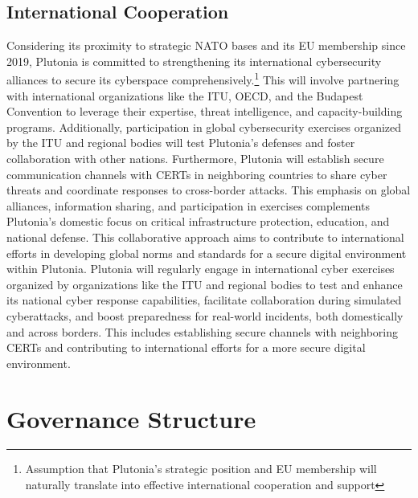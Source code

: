 \documentclass[
	a4paper, %
	10pt, %
]{CSSullivanBusinessReport}
\begin{document}
\begin{fullwidth}
\begin{justify}
\subsection{International Cooperation}
Considering its proximity to strategic NATO bases and its EU membership since 2019, Plutonia is committed to strengthening its international cybersecurity alliances to secure its cyberspace comprehensively.\footnote{Assumption that Plutonia’s strategic position and EU membership will naturally translate into effective international cooperation and support} This will involve partnering with international organizations like the ITU, OECD, and the Budapest Convention to leverage their expertise, threat intelligence, and capacity-building programs. Additionally, participation in global cybersecurity exercises organized by the ITU and regional bodies will test Plutonia's defenses and foster collaboration with other nations. Furthermore, Plutonia will establish secure communication channels with CERTs in neighboring countries to share cyber threats and coordinate responses to cross-border attacks. This emphasis on global alliances, information sharing, and participation in exercises complements Plutonia's domestic focus on critical infrastructure protection, education, and national defense. This collaborative approach aims to contribute to international efforts in developing global norms and standards for a secure digital environment within Plutonia. Plutonia will regularly engage in international cyber exercises organized by organizations like the ITU and regional bodies to test and enhance its national cyber response capabilities, facilitate collaboration during simulated cyberattacks, and boost preparedness for real-world incidents, both domestically and across borders. This includes establishing secure channels with neighboring CERTs and contributing to international efforts for a more secure digital environment.

\section{Governance Structure}

\end{justify}
\end{fullwidth}
\end{document}
